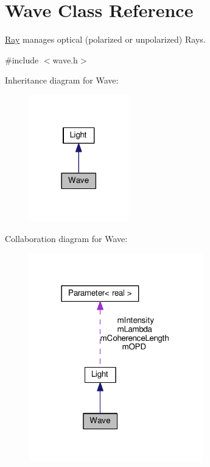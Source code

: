 \hypertarget{classWave}{}\section{Wave Class Reference}
\label{classWave}


\hyperlink{classRay}{Ray} manages optical (polarized or unpolarized) Rays.  




{\ttfamily \#include $<$wave.\+h$>$}



Inheritance diagram for Wave\+:\nopagebreak
\begin{figure}[H]
\begin{center}
\leavevmode
\includegraphics[width=122pt]{classWave__inherit__graph}
\end{center}
\end{figure}


Collaboration diagram for Wave\+:\nopagebreak
\begin{figure}[H]
\begin{center}
\leavevmode
\includegraphics[width=213pt]{classWave__coll__graph}
\end{center}
\end{figure}
